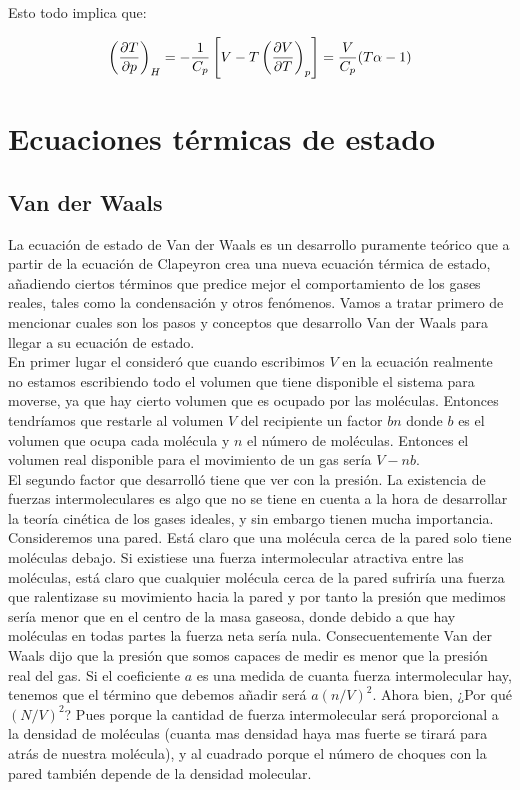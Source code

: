 \documentclass[12pt,a4paper,oneside]{book}
\begin{document}
Esto todo implica que:

\begin{equation}
\left( \frac{\partial T}{\partial p} \right)_H = - \dfrac{1}{C_p}  \left[ V-T\left( \frac{\partial V}{\partial T} \right)_p \right] = \dfrac{V}{C_p} (T \alpha -1)
\end{equation}

\section{Ecuaciones térmicas de estado}

\subsection{Van der Waals}

La ecuación de estado de Van der Waals es un desarrollo puramente teórico que a partir de la ecuación de Clapeyron crea una nueva ecuación térmica de estado, añadiendo ciertos términos que predice mejor el comportamiento de los gases reales, tales como la condensación y otros fenómenos. Vamos a tratar primero de mencionar cuales son los pasos y conceptos que desarrollo Van der Waals para llegar a su ecuación de estado. \\

En primer lugar el consideró que cuando escribimos $V$ en la ecuación realmente no estamos escribiendo todo el volumen que tiene disponible el sistema para moverse, ya que hay cierto volumen que es ocupado por las moléculas. Entonces tendríamos que restarle al volumen $V$ del recipiente un factor $bn$ donde $b$ es el volumen que ocupa cada molécula y $n$ el número de moléculas. Entonces el volumen real disponible para el movimiento de un gas sería $V-nb$. \\
 
El segundo factor que desarrolló tiene que ver con la presión. La existencia de fuerzas intermoleculares es algo que no se tiene en cuenta a la hora de desarrollar la teoría cinética de los gases ideales, y sin embargo tienen mucha importancia. Consideremos una pared. Está claro que una molécula cerca de la pared solo tiene moléculas debajo. Si existiese una fuerza intermolecular atractiva entre las moléculas, está claro que cualquier molécula cerca de la pared sufriría una fuerza que ralentizase su movimiento hacia la pared y por tanto la presión que medimos sería menor que en el centro de la masa gaseosa, donde debido a que hay moléculas en todas partes la fuerza neta sería nula. Consecuentemente Van der Waals dijo que la presión que somos capaces de medir es menor que la presión real del gas. Si el coeficiente $a$ es una medida de cuanta fuerza intermolecular hay, tenemos que el término que debemos añadir será $a(n/V)^2$. Ahora bien, ¿Por qué $(N/V)^2$? Pues porque la cantidad de fuerza intermolecular será proporcional a la densidad de moléculas (cuanta mas densidad haya mas fuerte se tirará para atrás de nuestra molécula), y al cuadrado porque el número de choques con la pared también depende de la densidad molecular. \\
\end{document}
